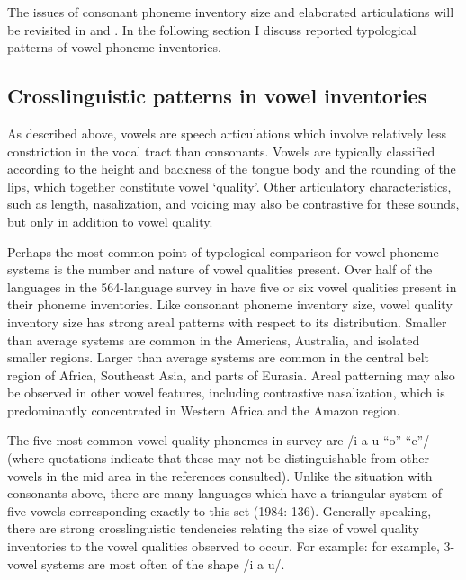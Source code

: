   The issues of consonant phoneme inventory size and elaborated articulations will be revisited in  and . In the following section I discuss reported typological patterns of vowel phoneme inventories.

\subsection{Crosslinguistic patterns in vowel inventories}\label{sec:4.1.2}

  As described above, vowels are speech articulations which involve relatively less constriction in the vocal tract than consonants. Vowels are typically classified according to the height and backness of the tongue body and the rounding of the lips, which together constitute vowel ‘quality’. Other articulatory characteristics, such as length, nasalization, and voicing may also be contrastive for these sounds, but only in addition to vowel quality.

  Perhaps the most common point of typological comparison for vowel phoneme systems is the number and nature of vowel qualities present. Over half of the languages in the 564-language survey in \citet{Maddieson2013c} have five or six vowel qualities present in their phoneme inventories. Like consonant phoneme inventory size, vowel quality inventory size has strong areal patterns with respect to its distribution. Smaller than average systems are common in the Americas, Australia, and isolated smaller regions. Larger than average systems are common in the central belt region of Africa, Southeast Asia, and parts of Eurasia. Areal patterning may also be observed in other vowel features, including contrastive nasalization, which is predominantly concentrated in Western Africa and the Amazon region.

  The five most common vowel quality phonemes in  survey are /i a u “o” “e”/ (where quotations indicate that these may not be distinguishable from other vowels in the mid area in the references consulted). Unlike the situation with consonants above, there are many languages which have a triangular system of five vowels corresponding exactly to this set (1984: 136). Generally speaking, there are strong crosslinguistic tendencies relating the size of vowel quality inventories to the vowel qualities observed to occur. For example: for example, 3-vowel systems are most often of the shape /i a u/. 

